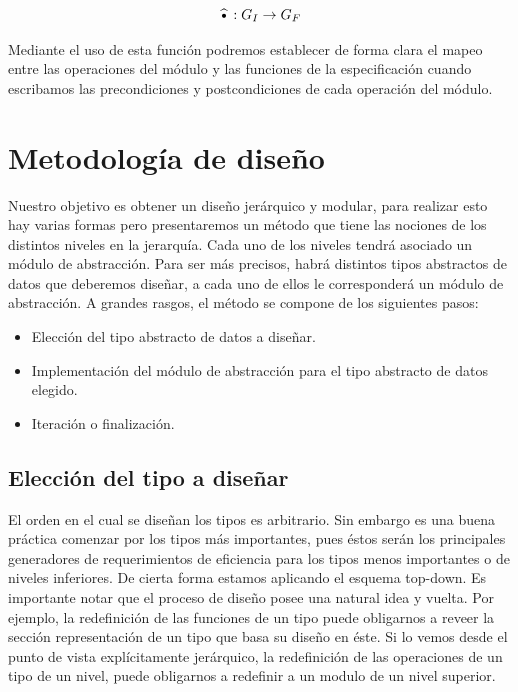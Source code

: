 \documentclass[10pt, a4paper]{report}
\begin{document}
\begin{equation*}
 \widehat{\text{\textbullet}}: G_I \rightarrow G_F
\end{equation*}

Mediante el uso de esta funci\'on podremos establecer de forma clara el mapeo entre las operaciones del m\'odulo y las funciones de la especificaci\'on cuando escribamos las precondiciones y postcondiciones de cada operaci\'on del m\'odulo.

\newpage

\section{Metodolog\'ia de dise\~no}

Nuestro objetivo es obtener un dise\~no jer\'arquico y modular, para realizar esto hay varias formas pero presentaremos un m\'etodo que tiene las nociones de los distintos niveles en la jerarqu\'ia. Cada uno de los niveles tendr\'a asociado un m\'odulo de abstracci\'on. Para ser m\'as precisos, habr\'a distintos tipos abstractos de datos que deberemos dise\~nar, a cada uno de ellos le corresponder\'a un m\'odulo de abstracci\'on. A grandes rasgos, el m\'etodo se compone de los siguientes pasos:

\begin{itemize}
 \item Elecci\'on del tipo abstracto de datos a dise\~nar.
 \item Implementaci\'on del m\'odulo de abstracci\'on para el tipo abstracto de datos elegido.
 \item Iteraci\'on o finalizaci\'on.
\end{itemize}

\subsection{Elecci\'on del tipo a dise\~nar}

El orden en el cual se dise\~nan los tipos es arbitrario. Sin embargo es una buena pr\'actica comenzar por los tipos m\'as importantes, pues \'estos ser\'an los principales generadores de requerimientos de eficiencia para los tipos menos importantes o de niveles inferiores. De cierta forma estamos aplicando el esquema top-down. Es importante notar que el proceso de dise\~no posee una natural idea y vuelta. Por ejemplo, la redefinici\'on de las funciones de un tipo puede obligarnos a reveer la secci\'on representaci\'on de un tipo que basa su dise\~no en \'este. Si lo vemos desde el punto de vista expl\'icitamente jer\'arquico, la redefinici\'on de las operaciones de un tipo de un nivel, puede obligarnos a redefinir a un modulo de un nivel superior.
\end{document}
